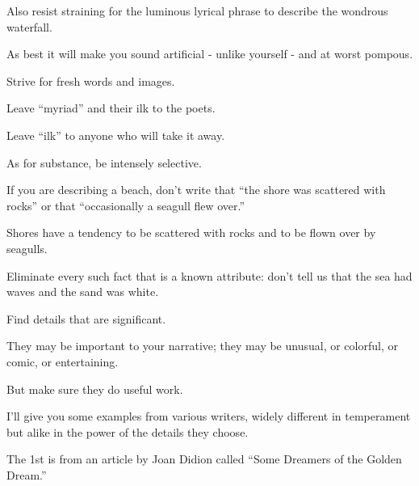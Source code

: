 \documentclass{book}
\numberwithin{equation}{section}
\begin{document}
Also resist straining for the luminous lyrical phrase to describe the wondrous waterfall.

As best it will make you sound artificial - unlike yourself - and at worst pompous.

Strive for fresh words and images.

Leave ``myriad'' and their ilk to the poets.

Leave ``ilk'' to anyone who will take it away.

%
As for substance, be intensely selective.

If you are describing a beach, don't write that ``the shore was scattered with rocks'' or that ``occasionally a seagull flew over.''

Shores have a tendency to be scattered with rocks and to be flown over by seagulls.

Eliminate every such fact that is a known attribute: don't tell us that the sea had waves and the sand was white.

Find details that are significant.

They may be important to your narrative; they may be unusual, or colorful, or comic, or entertaining.

But make sure they do useful work.

%
I'll give you some examples from various writers, widely different in temperament but alike in the power of the details they choose.

The 1st is from an article by Joan Didion called ``Some Dreamers of the Golden Dream.''
\end{document}
